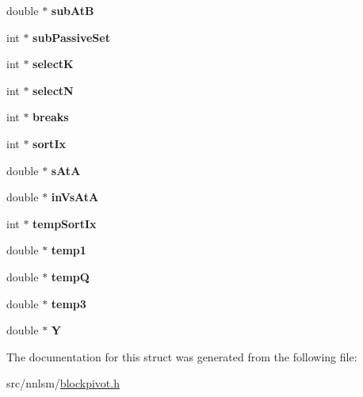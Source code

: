 \begin{DoxyCompactItemize}
\item 
\hypertarget{struct__memory_a13343266410f4bd758117a60b615973a}{double $\ast$ {\bfseries sub\-At\-B}}\label{struct__memory_a13343266410f4bd758117a60b615973a}

\item 
\hypertarget{struct__memory_acc7fd38ad4d1b9287f916f58eb373ee8}{int $\ast$ {\bfseries sub\-Passive\-Set}}\label{struct__memory_acc7fd38ad4d1b9287f916f58eb373ee8}

\item 
\hypertarget{struct__memory_ac9f1358e4ede2b01412fbbe87f82e20e}{int $\ast$ {\bfseries select\-K}}\label{struct__memory_ac9f1358e4ede2b01412fbbe87f82e20e}

\item 
\hypertarget{struct__memory_a408ad7da0e4339f07893438cd2e62ca4}{int $\ast$ {\bfseries select\-N}}\label{struct__memory_a408ad7da0e4339f07893438cd2e62ca4}

\item 
\hypertarget{struct__memory_a78947d202dc56187713b52cc24162111}{int $\ast$ {\bfseries breaks}}\label{struct__memory_a78947d202dc56187713b52cc24162111}

\item 
\hypertarget{struct__memory_ac12b89d06bdf82ea6bef35ed5fbd1a6b}{int $\ast$ {\bfseries sort\-Ix}}\label{struct__memory_ac12b89d06bdf82ea6bef35ed5fbd1a6b}

\item 
\hypertarget{struct__memory_a21fdbbe72c2f4932e4c446caf09760fc}{double $\ast$ {\bfseries s\-At\-A}}\label{struct__memory_a21fdbbe72c2f4932e4c446caf09760fc}

\item 
\hypertarget{struct__memory_ab213d947d4bb28ce080257fc2097a864}{double $\ast$ {\bfseries in\-Vs\-At\-A}}\label{struct__memory_ab213d947d4bb28ce080257fc2097a864}

\item 
\hypertarget{struct__memory_a51abdf9c593767c60f0deb6de727c390}{int $\ast$ {\bfseries temp\-Sort\-Ix}}\label{struct__memory_a51abdf9c593767c60f0deb6de727c390}

\item 
\hypertarget{struct__memory_ae1a11cebadf38d423a5cb73327cbbd16}{double $\ast$ {\bfseries temp1}}\label{struct__memory_ae1a11cebadf38d423a5cb73327cbbd16}

\item 
\hypertarget{struct__memory_af1d93d101a0703c7a4f1efae26af1272}{double $\ast$ {\bfseries temp\-Q}}\label{struct__memory_af1d93d101a0703c7a4f1efae26af1272}

\item 
\hypertarget{struct__memory_af03cd02c8cfc9bfd2d6400e1d0069212}{double $\ast$ {\bfseries temp3}}\label{struct__memory_af03cd02c8cfc9bfd2d6400e1d0069212}

\item 
\hypertarget{struct__memory_a5b9a9970bfbfec94ceb82429a5dc49d6}{double $\ast$ {\bfseries \-Y}}\label{struct__memory_a5b9a9970bfbfec94ceb82429a5dc49d6}

\end{DoxyCompactItemize}


\-The documentation for this struct was generated from the following file\-:\begin{DoxyCompactItemize}
\item 
src/nnlsm/\hyperlink{blockpivot_8h}{blockpivot.\-h}\end{DoxyCompactItemize}
